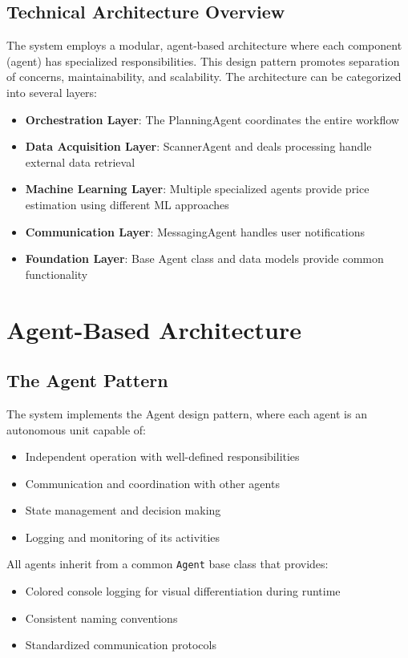 \subsection{Technical Architecture Overview}

The system employs a modular, agent-based architecture where each component (agent) has specialized responsibilities. This design pattern promotes separation of concerns, maintainability, and scalability. The architecture can be categorized into several layers:

\begin{itemize}[itemsep=0.5em]
\item \textbf{Orchestration Layer}: The PlanningAgent coordinates the entire workflow
\item \textbf{Data Acquisition Layer}: ScannerAgent and deals processing handle external data retrieval
\item \textbf{Machine Learning Layer}: Multiple specialized agents provide price estimation using different ML approaches
\item \textbf{Communication Layer}: MessagingAgent handles user notifications
\item \textbf{Foundation Layer}: Base Agent class and data models provide common functionality
\end{itemize}

\section{Agent-Based Architecture}

\subsection{The Agent Pattern}

The system implements the Agent design pattern, where each agent is an autonomous unit capable of:
\begin{itemize}
\item Independent operation with well-defined responsibilities
\item Communication and coordination with other agents
\item State management and decision making
\item Logging and monitoring of its activities
\end{itemize}

All agents inherit from a common \texttt{Agent} base class that provides:
\begin{itemize}
\item Colored console logging for visual differentiation during runtime
\item Consistent naming conventions
\item Standardized communication protocols
\end{itemize}

